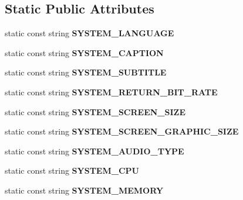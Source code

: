 \subsection*{Static Public Attributes}
\begin{CompactItemize}
\item 
static const string {\bf SYSTEM\_\-LANGUAGE}\label{classbr_1_1pucrio_1_1telemidia_1_1ginga_1_1ncl_1_1adaptation_1_1context_1_1ContextBase_6a4f7c70dab826c6c22e02fc31314035}

\item 
static const string {\bf SYSTEM\_\-CAPTION}\label{classbr_1_1pucrio_1_1telemidia_1_1ginga_1_1ncl_1_1adaptation_1_1context_1_1ContextBase_e7b983f815faa9f5cec428b3b809e1b5}

\item 
static const string {\bf SYSTEM\_\-SUBTITLE}\label{classbr_1_1pucrio_1_1telemidia_1_1ginga_1_1ncl_1_1adaptation_1_1context_1_1ContextBase_28e223e85ab43cadb4a703dfaadb9b31}

\item 
static const string {\bf SYSTEM\_\-RETURN\_\-BIT\_\-RATE}\label{classbr_1_1pucrio_1_1telemidia_1_1ginga_1_1ncl_1_1adaptation_1_1context_1_1ContextBase_90675bd06d6a3a6ecfe767d20db7a871}

\item 
static const string {\bf SYSTEM\_\-SCREEN\_\-SIZE}\label{classbr_1_1pucrio_1_1telemidia_1_1ginga_1_1ncl_1_1adaptation_1_1context_1_1ContextBase_cc5b6f2193fd6604266fee203eb40f72}

\item 
static const string {\bf SYSTEM\_\-SCREEN\_\-GRAPHIC\_\-SIZE}\label{classbr_1_1pucrio_1_1telemidia_1_1ginga_1_1ncl_1_1adaptation_1_1context_1_1ContextBase_44850ef4b319de650ac7a712baddcd06}

\item 
static const string {\bf SYSTEM\_\-AUDIO\_\-TYPE}\label{classbr_1_1pucrio_1_1telemidia_1_1ginga_1_1ncl_1_1adaptation_1_1context_1_1ContextBase_84eaa6f0326bb1cb204714963671e3a5}

\item 
static const string {\bf SYSTEM\_\-CPU}\label{classbr_1_1pucrio_1_1telemidia_1_1ginga_1_1ncl_1_1adaptation_1_1context_1_1ContextBase_39da1beab8aba2cf2697f20c940e55ff}

\item 
static const string {\bf SYSTEM\_\-MEMORY}\label{classbr_1_1pucrio_1_1telemidia_1_1ginga_1_1ncl_1_1adaptation_1_1context_1_1ContextBase_6b24e86521c88d9aafe1286530c8b3ed}


\end{CompactItemize}
